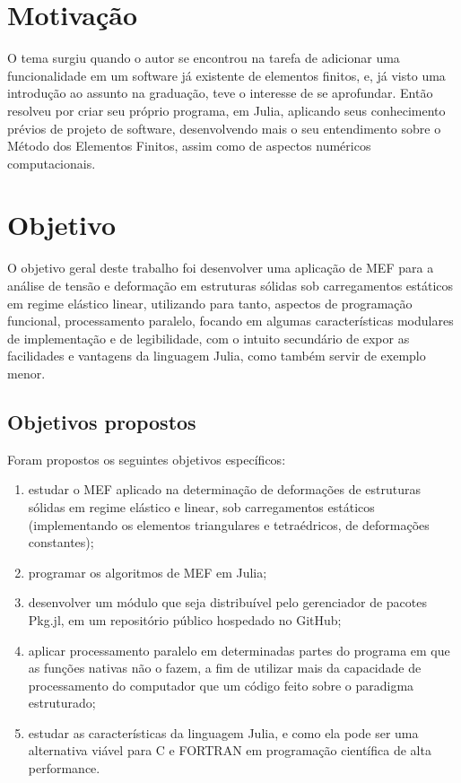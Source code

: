 \section{Motivação}

O tema surgiu quando o autor se encontrou na tarefa de adicionar uma funcionalidade em um software já existente de elementos finitos, e, já visto uma introdução ao assunto na graduação, teve o interesse de se aprofundar. Então resolveu por criar seu próprio programa, em Julia, aplicando seus conhecimento prévios de projeto de software, desenvolvendo mais o seu entendimento sobre o Método dos Elementos Finitos, assim como de aspectos numéricos computacionais.


\section{Objetivo}

O objetivo geral deste trabalho foi desenvolver uma aplicação de MEF para a análise de tensão e deformação em estruturas sólidas sob carregamentos estáticos em regime elástico linear, utilizando para tanto, aspectos de programação funcional, processamento paralelo, focando em algumas características modulares de implementação e de legibilidade, com o intuito secundário de expor as facilidades e vantagens da linguagem Julia, como também servir de exemplo menor.

\subsection{Objetivos propostos}

Foram propostos os seguintes objetivos específicos:

\begin{enumerate}
    \item estudar o MEF aplicado na determinação de deformações de estruturas sólidas em regime elástico e linear, sob carregamentos estáticos (implementando os elementos triangulares e tetraédricos, de deformações constantes);
    \item programar os algoritmos de MEF em Julia;
    \item desenvolver um módulo que seja distribuível pelo gerenciador de pacotes Pkg.jl, em um repositório público hospedado no GitHub;
    \item aplicar processamento paralelo em determinadas partes do programa em que as funções nativas não o fazem, a fim de utilizar mais da capacidade de processamento do computador que um código feito sobre o paradigma estruturado;
    \item estudar as características da linguagem Julia, e como ela pode ser uma alternativa viável para C e FORTRAN em programação científica de alta performance.
\end{enumerate}

